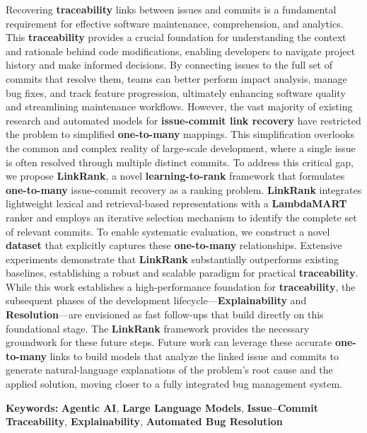 Recovering \textbf{traceability} links between issues and commits is a fundamental requirement for effective software maintenance, comprehension, and analytics. This \textbf{traceability} provides a crucial foundation for understanding the context and rationale behind code modifications, enabling developers to navigate project history and make informed decisions. By connecting issues to the full set of commits that resolve them, teams can better perform impact analysis, manage bug fixes, and track feature progression, ultimately enhancing software quality and streamlining maintenance workflows. However, the vast majority of existing research and automated models for \textbf{issue-commit link recovery} have restricted the problem to simplified \textbf{one-to-many} mappings. This simplification overlooks the common and complex reality of large-scale development, where a single issue is often resolved through multiple distinct commits. To address this critical gap, we propose \textbf{LinkRank}, a novel \textbf{learning-to-rank} framework that formulates \textbf{one-to-many} issue-commit recovery as a ranking problem. \textbf{LinkRank} integrates lightweight lexical and retrieval-based representations with a \textbf{LambdaMART} ranker and employs an iterative selection mechanism to identify the complete set of relevant commits. To enable systematic evaluation, we construct a novel \textbf{dataset} that explicitly captures these \textbf{one-to-many} relationships. Extensive experiments demonstrate that \textbf{LinkRank} substantially outperforms existing baselines, establishing a robust and scalable paradigm for practical \textbf{traceability}.\\

While this work establishes a high-performance foundation for \textbf{traceability}, the subsequent phases of the development lifecycle—\textbf{Explainability} and \textbf{Resolution}—are envisioned as fast follow-ups that build directly on this foundational stage. The \textbf{LinkRank} framework provides the necessary groundwork for these future steps. Future work can leverage these accurate \textbf{one-to-many} links to build models that analyze the linked issue and commits to generate natural-language explanations of the problem's root cause and the applied solution, moving closer to a fully integrated bug management system.\\
\vspace{0.2in}

\textbf{Keywords:} \textbf{Agentic AI}, \textbf{Large Language Models}, \textbf{Issue–Commit Traceability}, \textbf{Explainability}, \textbf{Automated Bug Resolution}

\newpage
